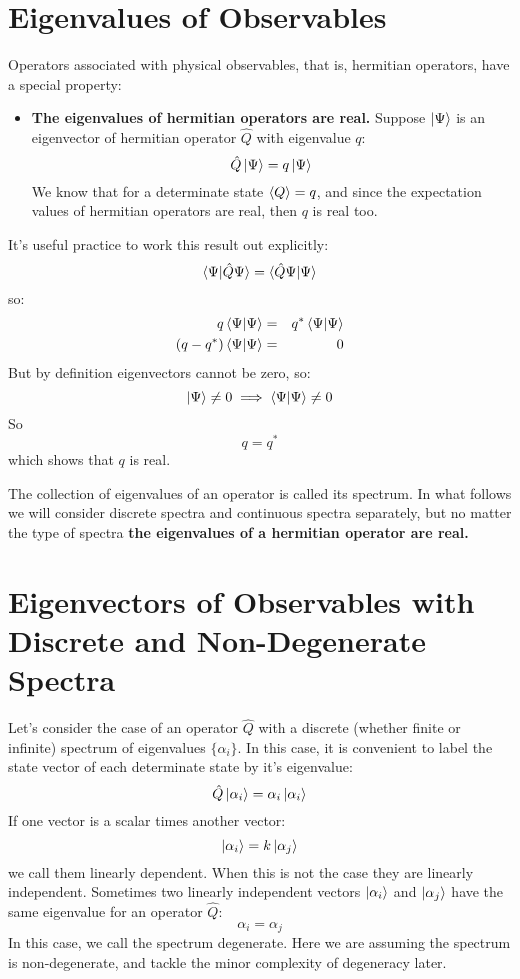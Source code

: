 \documentclass[12pt]{book}
\begin{document}
\section{Eigenvalues of Observables}

Operators associated with physical observables, that is, hermitian operators, have a special property:
\begin{itemize}
\item {\bf The eigenvalues of hermitian operators are real.}  Suppose $\ket{\Psi}$ is an eigenvector of hermitian operator $\hat{Q}$ with eigenvalue $q$:
$$\hat{Q}\ket{\Psi} = q \ket{\Psi}$$
We know that for a determinate state $\braket{Q} = q$, and since the expectation values of hermitian operators are real, then $q$ is real too.  
\end{itemize}

\noindent
It's useful practice to work this result out explicitly:
$$\braket{\Psi | \hat{Q} \Psi} = \braket{\hat{Q} \Psi | \Psi}$$
so:
\begin{eqnarray*}
q \braket{\Psi | \Psi} &=& q^* \braket{\Psi | \Psi}\\
(q-q^*) \braket{\Psi | \Psi} &=& 0\\
\end{eqnarray*}
But by definition eigenvectors cannot be zero, so:
$$\ket{\Psi} \neq 0 \implies \braket{\Psi | \Psi} \neq 0$$
So 
$$q=q^*$$
which shows that $q$ is real.

The collection of eigenvalues of an operator is called its spectrum.  In what follows we will consider discrete spectra and continuous spectra separately, but no matter the type of spectra {\bf the eigenvalues of a hermitian operator are real.}

\section{Eigenvectors of Observables with Discrete and Non-Degenerate Spectra}

Let's consider the case of an operator $\hat{Q}$ with a discrete (whether finite or infinite) spectrum of eigenvalues $\{\alpha_i\}$.  In this case, it is convenient to label the state vector of each determinate state by it's eigenvalue:
$$\hat{Q}\ket{\alpha_i} = \alpha_i \ket{\alpha_i}$$
If one vector is a scalar times another vector:
$$\ket{\alpha_i} = k \ket{\alpha_j}$$
we call them linearly dependent.  When this is not the case they are linearly independent.
Sometimes two linearly independent vectors $\ket{\alpha_i}$ and $\ket{\alpha_j}$ have the same eigenvalue for an operator $\hat{Q}$:
$$\alpha_i = \alpha_j$$
In this case, we call the spectrum degenerate.  Here we are assuming the spectrum is non-degenerate, and tackle the minor complexity of degeneracy later.
\end{document}
